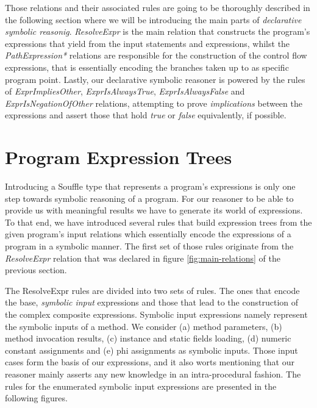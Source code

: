 Those relations and their associated rules are going to be thoroughly described in the
following section where we will be introducing the main parts of \emph{declarative symbolic reasonig}.
\emph{ResolveExpr} is the main relation that constructs the program's expressions that yield
from the input statements and expressions, whilst the \emph{PathExpression*} relations are responsible
for the construction of the control flow expressions, that is essentially encoding the
branches taken up to as specific program point. Lastly, our declarative symbolic reasoner
is powered by the rules of \emph{ExprImpliesOther}, \emph{ExprIsAlwaysTrue}, \emph{ExprIsAlwaysFalse}
and \emph{ExprIsNegationOfOther} relations, attempting to prove \emph{implications} between the expressions
and assert those that hold \emph{true} or \emph{false} equivalently, if possible.\\

\section{Program Expression Trees}


Introducing a Souffle type that represents a program's expressions is only one
step towards symbolic reasoning of a program. For our reasoner to be able to provide us
with meaningful results we have to generate its world of expressions. To that end, we
have introduced several rules that build expression trees from the given program's
input relations which essentially encode the expressions of a program in a symbolic
manner. The first set of those rules originate from the \emph{ResolveExpr} relation
that was declared in figure \ref{fig:main-relations} of the previous section.

The ResolveExpr rules are divided into two sets of rules. The ones that encode
the base, \emph{symbolic input} expressions and those that lead to the construction of the
complex composite expressions. Symbolic input expressions namely represent the
symbolic inputs of a method. We consider (a) method parameters, (b) method invocation
results, (c) instance and static fields loading, (d) numeric constant assignments and
(e) phi assignments as symbolic inputs. Those input cases form the basis of our
expressions, and it also worts mentioning that our reasoner mainly asserts any new
knowledge in an intra-procedural fashion. The rules for the enumerated symbolic
input expressions are presented in the following figures.


